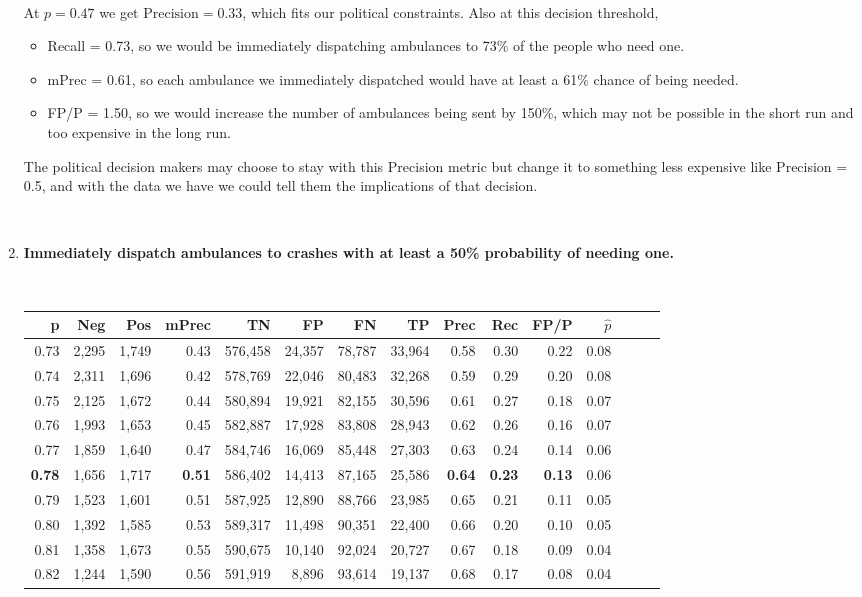\begin{enumerate}
\
	
	At $p=0.47$ we get $\text{Precision} = 0.33$, which fits our political constraints.  Also at this decision threshold,  
	
\begin{itemize}
	\item Recall = 0.73, so we would be immediately dispatching ambulances to 73\% of the people who need one.  
	\item mPrec = 0.61, so each ambulance we immediately dispatched would have at least a 61\% chance of being needed.  
	\item FP/P = 1.50, so we would increase the number of ambulances being sent by 150\%, which may not be possible in the short run and too expensive in the long run.  
\end{itemize}

The political decision makers may choose to stay with this Precision metric but change it to something less expensive like Precision = 0.5, and with the data we have we could tell them the implications of that decision.  
	
	
	\
	
	\item {\bf Immediately dispatch ambulances to crashes with at least a 50\% probability of needing one.}  
	
	\
	
\begin{tabular}{rrrrrrrrrrrrrrr}
\toprule
p &     Neg &    Pos & mPrec &       TN &       FP &       FN &       TP &  Prec &   Rec &  FP/P & $\hat{p}$ \\
\midrule
0.73 &   2,295 &  1,749 &  0.43 &  576,458 &   24,357 &   78,787 &   33,964 &  0.58 &  0.30 &  0.22 &      0.08 \\
0.74 &   2,311 &  1,696 &  0.42 &  578,769 &   22,046 &   80,483 &   32,268 &  0.59 &  0.29 &  0.20 &      0.08 \\
0.75 &   2,125 &  1,672 &  0.44 &  580,894 &   19,921 &   82,155 &   30,596 &  0.61 &  0.27 &  0.18 &      0.07 \\
0.76 &   1,993 &  1,653 &  0.45 &  582,887 &   17,928 &   83,808 &   28,943 &  0.62 &  0.26 &  0.16 &      0.07 \\
0.77 &   1,859 &  1,640 &  0.47 &  584,746 &   16,069 &   85,448 &   27,303 &  0.63 &  0.24 &  0.14 &      0.06 \\
\bf 0.78 &   1,656 &  1,717 & \bf  0.51 &  586,402 &   14,413 &   87,165 &   25,586 & \bf 0.64 & \bf  0.23 & \bf 0.13 &      0.06 \\
0.79 &   1,523 &  1,601 &  0.51 &  587,925 &   12,890 &   88,766 &   23,985 &  0.65 &  0.21 &  0.11 &      0.05 \\
0.80 &   1,392 &  1,585 &  0.53 &  589,317 &   11,498 &   90,351 &   22,400 &  0.66 &  0.20 &  0.10 &      0.05 \\
0.81 &   1,358 &  1,673 &  0.55 &  590,675 &   10,140 &   92,024 &   20,727 &  0.67 &  0.18 &  0.09 &      0.04 \\
0.82 &   1,244 &  1,590 &  0.56 &  591,919 &    8,896 &   93,614 &   19,137 &  0.68 &  0.17 &  0.08 &      0.04 \\
\bottomrule
\end{tabular}
	

\end{enumerate}
